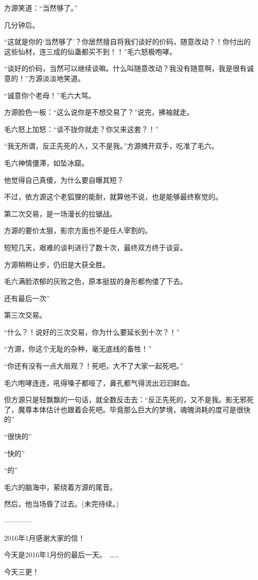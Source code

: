 \begin{this_body}
方源笑道：“当然够了。”

几分钟后。

“这就是你的‘当然够了’？你居然擅自将我们谈好的价码，随意改动？！你付出的这些仙材，连三成的仙蛊都买不到！！”毛六怒极咆哮。

“谈好的价码，当然可以继续谈嘛。什么叫随意改动？我没有随意啊，我是很有诚意的！”方源淡淡地笑道。

“诚意你个老母！”毛六大骂。

方源脸色一板：“这么说你是不想交易了？”说完，拂袖就走。

毛六怒上加怒：“谈不拢你就走？你又来这套？！”

“我无所谓，反正先死的人，又不是我。”方源摊开双手，吃准了毛六。

毛六神情僵滞，如坠冰窟。

他觉得自己真傻，为什么要自曝其短？

不过，依方源这个老狐狸的能耐，就算他不说，也是能够最终察觉的。

第二次交易，是一场漫长的拉锯战。

方源的要价太狠，影宗方面也不是任人宰割的。

短短几天，艰难的谈判进行了数十次，最终双方终于谈妥。

方源稍稍让步，仍旧是大获全胜。

毛六满脸浓郁的灰败之色，原本挺拔的身形都佝偻了下去。

还有最后一次”

第三次交易。

“什么？！说好的三次交易，你为什么要延长到十次？！”

“方源，你这个无耻的杂种，毫无底线的畜牲！”

“你还有没有一点大局观？！死吧，大不了大家一起死吧。”

毛六咆哮连连，吼得嗓子都哑了，鼻孔都气得流出汩汩鲜血。

但方源只是轻飘飘的一句话，就全数反击去：“反正先死的，又不是我。影无邪死了，魔尊本体估计也跟着会死吧。毕竟那么巨大的梦境，魂魄消耗的度可是很快的”

“很快的”

“快的”

“的”

毛六的脑海中，萦绕着方源的尾音。

然后，他当场昏了过去。(未完待续。)

------------

2016年1月感谢大家的信！

今天是2016年1月份的最后一天。　……

今天三更！


\end{this_body}
